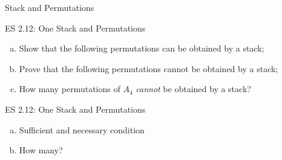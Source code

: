\begin{frame}{}
  \centerline{\LARGE Stack and Permutations}
\end{frame}

\begin{frame}{}
  \begin{exampleblock}{ES 2.12: One Stack and Permutations}
    \begin{enumerate}[(a)]
      \item Show that the following permutations can be obtained by a stack;
      \item Prove that the following permutations cannot be obtained by a stack;
      \item How many permutations of $A_4$ \emph{cannot} be obtained by a stack?
      \end{enumerate}
  \end{exampleblock}
\end{frame}

\begin{frame}{}
  \begin{exampleblock}{ES 2.12: One Stack and Permutations}
    \begin{enumerate}[(a)]
      \item Sufficient and necessary condition
      \item How many?
    \end{enumerate}
  \end{exampleblock}
\end{frame}

